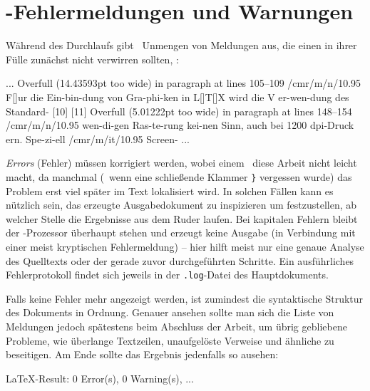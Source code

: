 \section{\latex-Fehlermeldungen und Warnungen}

Während des Durchlaufs gibt \latex\ Unmengen von Meldungen aus, die einen in
ihrer Fülle zunächst nicht verwirren sollten, \zB:

\begin{GenericCode}[numbers=none]
...
Overfull \hbox (14.43593pt too wide) in paragraph at lines 105--109
/cmr/m/n/10.95 F[]ur die Ein-bin-dung von Gra-phi-ken in L[]T[]X wird die V
er-wen-dung des Standard-
[10] [11]
Overfull \hbox (5.01222pt too wide) in paragraph at lines 148--154
/cmr/m/n/10.95 wen-di-gen Ras-te-rung kei-nen Sinn, auch bei 1200 dpi-Druck
ern. Spe-zi-ell /cmr/m/it/10.95 Screen-
...
\end{GenericCode}

\noindent
\emph{Errors} (Fehler) müssen korrigiert werden, wobei einem \latex\ diese
Arbeit nicht leicht macht, da manchmal (\zB\ wenn eine schließende Klammer
\verb!}! vergessen wurde) das Problem erst viel später im Text lokalisiert
wird. In solchen Fällen kann es nützlich sein, das erzeugte Ausgabedokument
zu inspizieren um festzustellen, ab welcher Stelle die Ergebnisse aus dem
Ruder laufen. Bei kapitalen Fehlern bleibt der \latex-Prozessor überhaupt
stehen und erzeugt keine Ausgabe (in Verbindung mit einer meist kryptischen
Fehlermeldung) -- hier hilft meist nur eine genaue Analyse des Quelltexts
oder der gerade zuvor durchgeführten Schritte. Ein ausführliches
Fehlerprotokoll findet sich jeweils in der \verb!.log!-Datei des Hauptdokuments.

Falls keine Fehler mehr angezeigt werden, ist zumindest die syntaktische
Struktur des Dokuments in Ordnung. Genauer ansehen sollte man sich die Liste
von Meldungen jedoch spätestens beim Abschluss der Arbeit, um übrig
gebliebene Probleme, wie überlange Textzeilen, unaufgelöste Verweise und
ähnliche zu beseitigen. Am Ende sollte das Ergebnis jedenfalls so ausehen:
%
\begin{GenericCode}[numbers=none]
LaTeX-Result: 0 Error(s), 0 Warning(s), ...
\end{GenericCode}
